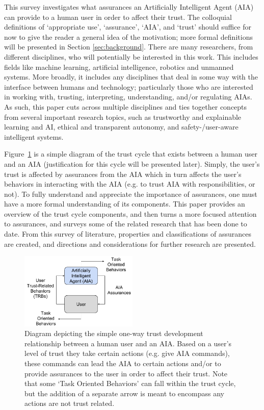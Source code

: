 This survey investigates what assurances an Artificially Intelligent Agent (AIA) can provide to a human user in order to affect their trust. The colloquial definitions of `appropriate use', `assurance', `AIA', and `trust' should suffice for now to give the reader a general idea of the motivation; more formal definitions will be presented in Section \ref{sec:background}. There are many researchers, from different disciplines, who will potentially be interested in this work. This includes fields like machine learning, artificial intelligence, robotics and unmanned systems. More broadly, it includes any disciplines that deal in some way with the interface between humans and technology; particularly those who are interested in working with, trusting, interpreting, understanding, and/or regulating AIAs. As such, this paper cuts across multiple disciplines and ties together concepts from several important research topics, such as trustworthy and explainable learning and AI, ethical and transparent autonomy, and safety-/user-aware intelligent systems.

    Figure~\ref{fig:SimpleTrust_one_way} is a simple diagram of the trust cycle that exists between a human user and an AIA (justification for this cycle will be presented later). Simply, the user's trust is affected by assurances from the AIA which in turn affects the user's behaviors in interacting with the AIA (e.g. to trust AIA with responsibilities, or not). To fully understand and appreciate the importance of assurances, one must have a more formal understanding of its components. This paper provides an overview of the trust cycle components, and then turns a more focused attention to assurances, and surveys some of the related research that has been done to date. From this survey of literature, properties and classifications of assurances are created, and directions and considerations for further research are presented.

    \begin{figure}
        \centering
        \includegraphics[width=0.5\textwidth]{Figures/SimpleTrust_one_way}
        \caption{Diagram depicting the simple one-way trust development relationship between a human user and an AIA. Based on a user's level of trust they take certain actions (e.g. give AIA commands), these commands can lead the AIA to certain actions and/or to provide assurances to the user in order to affect their trust. Note that some `Task Oriented Behaviors' can fall within the trust cycle, but the addition of a separate arrow is meant to encompass any actions are not trust related.}
        \label{fig:SimpleTrust_one_way}
    \end{figure}

